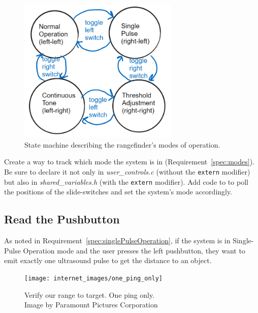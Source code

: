 \begin{figure}[h]
    \centering
    \includegraphics[width=3in]{modeStateMachine}
    \caption{\label{fig:modeStateMachine} State machine describing the rangefinder's modes of operation.}
\end{figure}

Create a way to track which mode the system is in (Requirement~\ref{spec:modes}).
Be sure to declare it not only in \textit{user\_controls.c} (without the \lstinline{extern} modifier) but also in \textit{shared\_variables.h} (with the \lstinline{extern} modifier).
Add code to  to poll the positions of the slide-switches and set the system's mode accordingly.

\subsection{Read the Pushbutton} \label{subsec:readPushbutton}

As noted in Requirement~\ref{spec:singlePulseOperation}, if the system is in Single-Pulse Operation mode and the user presses the left pushbutton, they want to emit exactly one ultrasound pulse to get the distance to an object.
\begin{figure}[h]
    \centering
    \texttt{[image: internet\_images/one\_ping\_only]}
    \caption{Verify our range to target. One ping only. \\ \tiny Image by Paramount Pictures Corporation \label{fig:onePingOnly}}
\end{figure}

